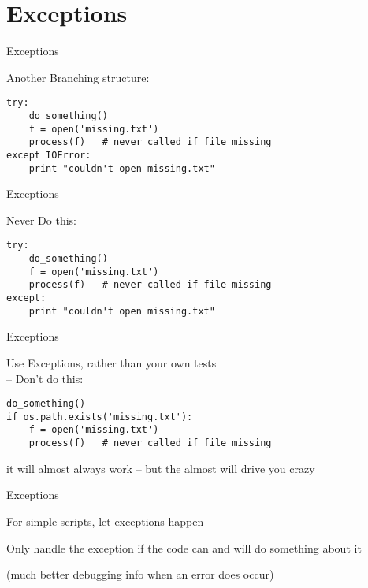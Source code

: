 \documentclass{beamer}
\begin{document}
\section{Exceptions}

\begin{frame}[fragile]{Exceptions}

{\Large Another Branching structure:}
\vfill
\begin{verbatim}
try:
    do_something()
    f = open('missing.txt')
    process(f)   # never called if file missing
except IOError:
    print "couldn't open missing.txt"
\end{verbatim}
\vfill
\end{frame}

\begin{frame}[fragile]{Exceptions}

{\Large Never Do this:}
\vfill
\begin{verbatim}
try:
    do_something()
    f = open('missing.txt')
    process(f)   # never called if file missing
except:
    print "couldn't open missing.txt"
\end{verbatim}
\vfill
\end{frame}

\begin{frame}[fragile]{Exceptions}

{\Large Use Exceptions, rather than your own tests\\
 -- Don't do this:}
\vfill
\begin{verbatim}
do_something()
if os.path.exists('missing.txt'):
    f = open('missing.txt')
    process(f)   # never called if file missing
\end{verbatim}
\vfill
it will almost always work -- but the almost will drive you crazy
\end{frame}

\begin{frame}[fragile]{Exceptions}

{\centering

{\Large "easier to ask forgiveness than permission"
\vfill
\hfill -- Grace Hopper
}

\vfill
\url{http://www.youtube.com/watch?v=AZDWveIdqjY}
\end{frame}

\begin{frame}[fragile]{Exceptions}

\vfill
{\Large 
For simple scripts, let exceptions happen\\
\vfill

Only handle the exception if the code can and will do something about it
}
\vfill
(much better debugging info when an error does occur)
\end{frame}
\end{document}
